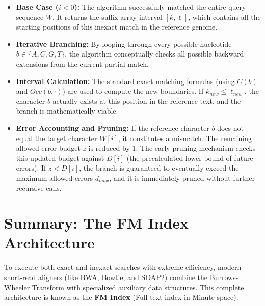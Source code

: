 \begin{itemize}
    \item \textbf{Base Case ($i < 0$):} The algorithm successfully matched the entire query sequence $W$. It returns the suffix array interval $[k, \ell]$, which contains all the starting positions of this inexact match in the reference genome.
    \item \textbf{Iterative Branching:} By looping through every possible nucleotide $b \in \{A, C, G, T\}$, the algorithm conceptually checks all possible backward extensions from the current partial match.
    \item \textbf{Interval Calculation:} The standard exact-matching formulas (using $C(b)$ and $Occ(b, \cdot)$) are used to compute the new boundaries. If $k_{new} \leq \ell_{new}$, the character $b$ actually exists at this position in the reference text, and the branch is mathematically viable.
    \item \textbf{Error Accounting and Pruning:} If the reference character $b$ does not equal the target character $W[i]$, it constitutes a mismatch. The remaining allowed error budget $z$ is reduced by 1. The early pruning mechanism checks this updated budget against $D[i]$ (the precalculated lower bound of future errors). If $z < D[i]$, the branch is guaranteed to eventually exceed the maximum allowed errors $d_{max}$, and it is immediately pruned without further recursive calls.
\end{itemize}

\section{Summary: The FM Index Architecture}

To execute both exact and inexact searches with extreme efficiency, modern short-read aligners (like BWA, Bowtie, and SOAP2) combine the Burrows-Wheeler Transform with specialized auxiliary data structures. This complete architecture is known as the \textbf{FM Index} (Full-text index in Minute space).

